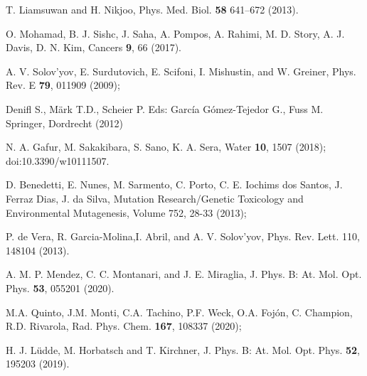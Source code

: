 \documentclass[10pt,showpacs,showkeys,twocolumn]{revtex4}
\begin{document}
\begin{thebibliography}{}

 T. Liamsuwan and H. Nikjoo, Phys. Med. Biol. \textbf{58}  641–672 (2013).

O. Mohamad, B. J. Sishc, J. Saha, A. Pompos, A. Rahimi, M. D. Story, A. J. Davis, D. N. Kim, Cancers \textbf{9}, 66 (2017).

 A. V. Solov'yov, E. Surdutovich, E. Scifoni, I. Mishustin, and W. Greiner, Phys. Rev. E \textbf{79}, 011909 (2009);

Denifl S., Märk T.D., Scheier P. 
Eds: García Gómez-Tejedor G., Fuss M. 
Springer, Dordrecht (2012) 

 N. A. Gafur, M.  Sakakibara, S. Sano, K. A. Sera, 
Water \textbf{10}, 1507 (2018); doi:10.3390/w10111507.

 D. Benedetti, E. Nunes, M. Sarmento, C. Porto, C. E. Iochims dos Santos, J. Ferraz Dias, J. da Silva,
Mutation Research/Genetic Toxicology and Environmental Mutagenesis,
Volume 752, 28-33 (2013);

 P. de Vera, R. Garcia-Molina,I. Abril, and A. V. Solov’yov, Phys. Rev. Lett.  110, 148104 (2013).

A. M. P. Mendez, C. C. Montanari, and J. E. Miraglia, J. Phys. B: At. Mol. Opt. Phys.  \textbf{53}, 055201 (2020).

 M.A. Quinto, J.M. Monti, C.A. Tachino, P.F. Weck, O.A. Fojón, C. Champion, R.D. Rivarola, 
Rad. Phys. Chem. \textbf{167}, 108337 (2020);

H. J. L\"udde,  M. Horbatsch and T. Kirchner, J. Phys. B: At. Mol. Opt. Phys.  \textbf{52}, 195203 (2019).


\end{thebibliography}
\end{document}
